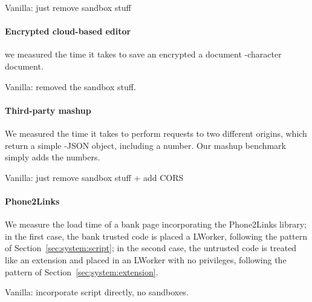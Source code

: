 Vanilla: just remove sandbox stuff

\paragraph{Encrypted cloud-based editor}
%
we measured the time it takes to save an encrypted a document
-character document.

Vanilla: removed the sandbox stuff.

\paragraph{Third-party mashup}

We measured the time it takes to perform requests to two different origins,
which return a simple -JSON object, including a number.
%
Our mashup benchmark simply adds the numbers.


Vanilla: just remove sandbox stuff + add CORS

\paragraph{Phone2Links}

We measure the load time of a bank page incorporating the Phone2Links library;
in the first case, the bank trusted code is placed a LWorker, following the
pattern of Section~\ref{sec:system:script}; in the second case, the untrusted
code is treated like an extension and placed in an LWorker with no privileges,
following the pattern of Section~\ref{sec;system:extension}.

Vanilla: incorporate script directly, no sandboxes.
